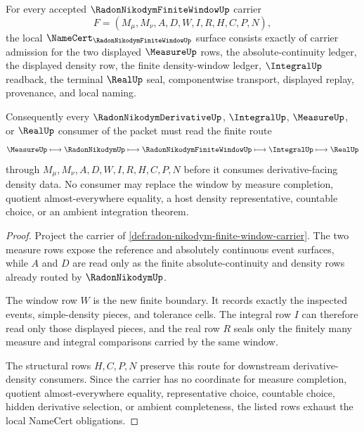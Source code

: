 \begin{theorem}
\label{thm:radon-nikodym-finite-window-namecert-obligations}
For every accepted $\RadonNikodymFiniteWindowUp$ carrier
$$
F=(M_\mu,M_\nu,A,D,W,I,R,H,C,P,N),
$$
the local $\NameCert_{\RadonNikodymFiniteWindowUp}$ surface consists exactly of carrier admission for the two displayed $\MeasureUp$ rows, the absolute-continuity ledger, the displayed density row, the finite density-window ledger, $\IntegralUp$ readback, the terminal $\RealUp$ seal, componentwise transport, displayed replay, provenance, and local naming.

Consequently every $\RadonNikodymDerivativeUp$, $\IntegralUp$, $\MeasureUp$, or $\RealUp$ consumer of the packet must read the finite route
$$
\MeasureUp \longmapsto \RadonNikodymUp \longmapsto \RadonNikodymFiniteWindowUp \longmapsto \IntegralUp \longmapsto \RealUp
$$
through $M_\mu,M_\nu,A,D,W,I,R,H,C,P,N$ before it consumes derivative-facing density data. No consumer may replace the window by measure completion, quotient almost-everywhere equality, a host density representative, countable choice, or an ambient integration theorem.
\end{theorem}
\begin{proof}
Project the carrier of \autoref{def:radon-nikodym-finite-window-carrier}. The two measure rows expose the reference and absolutely continuous event surfaces, while $A$ and $D$ are read only as the finite absolute-continuity and density rows already routed by $\RadonNikodymUp$.

The window row $W$ is the new finite boundary. It records exactly the inspected events, simple-density pieces, and tolerance cells. The integral row $I$ can therefore read only those displayed pieces, and the real row $R$ seals only the finitely many measure and integral comparisons carried by the same window.

The structural rows $H,C,P,N$ preserve this route for downstream derivative-density consumers. Since the carrier has no coordinate for measure completion, quotient almost-everywhere equality, representative choice, countable choice, hidden derivative selection, or ambient completeness, the listed rows exhaust the local NameCert obligations.
\end{proof}


